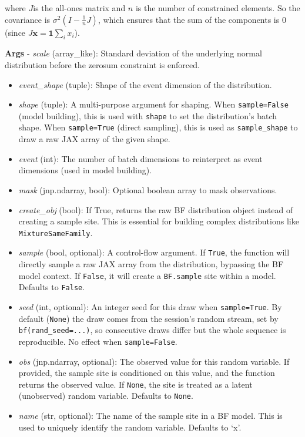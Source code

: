 \documentclass[
  letterpaper,
  DIV=11,
  numbers=noendperiod]{scrartcl}
\begin{document}
where \(J\)is the all-ones matrix and \(n\) is the number of constrained
elements. So the covariance is \(\sigma^2 (I - \tfrac{1}{n} J)\), which
ensures that the sum of the components is 0 (since
\(J \mathbf{x} = \mathbf{1} \sum_i x_i\)).

\textbf{Args} - \emph{scale} (array\_like): Standard deviation of the
underlying normal distribution before the zerosum constraint is
enforced.

\begin{itemize}
\item
  \emph{event\_shape} (tuple): Shape of the event dimension of the
  distribution.
\item
  \emph{shape} (tuple): A multi-purpose argument for shaping. When
  \texttt{sample=False} (model building), this is used with
  \texttt{shape} to set the distribution's batch shape. When
  \texttt{sample=True} (direct sampling), this is used as
  \texttt{sample\_shape} to draw a raw JAX array of the given shape.
\item
  \emph{event} (int): The number of batch dimensions to reinterpret as
  event dimensions (used in model building).
\item
  \emph{mask} (jnp.ndarray, bool): Optional boolean array to mask
  observations.
\item
  \emph{create\_obj} (bool): If True, returns the raw BF distribution
  object instead of creating a sample site. This is essential for
  building complex distributions like \texttt{MixtureSameFamily}.
\item
  \emph{sample} (bool, optional): A control-flow argument. If
  \texttt{True}, the function will directly sample a raw JAX array from
  the distribution, bypassing the BF model context. If \texttt{False},
  it will create a \texttt{BF.sample} site within a model. Defaults to
  \texttt{False}.
\item
  \emph{seed} (int, optional): An integer seed for this draw when
  \texttt{sample=True}. By default (\texttt{None}) the draw comes from
  the session's random stream, set by \texttt{bf(rand\_seed=...)}, so
  consecutive draws differ but the whole sequence is reproducible. No
  effect when \texttt{sample=False}.
\item
  \emph{obs} (jnp.ndarray, optional): The observed value for this random
  variable. If provided, the sample site is conditioned on this value,
  and the function returns the observed value. If \texttt{None}, the
  site is treated as a latent (unobserved) random variable. Defaults to
  \texttt{None}.
\item
  \emph{name} (str, optional): The name of the sample site in a BF
  model. This is used to uniquely identify the random variable. Defaults
  to `x'.
\end{itemize}
\end{document}
